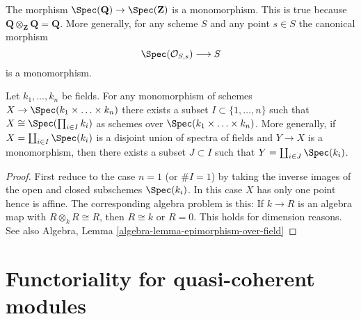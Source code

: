 \begin{example}
\label{example-Q-over-Z}
The morphism $\Spec(\mathbf{Q}) \to \Spec(\mathbf{Z})$
is a monomorphism. This is true because
$\mathbf{Q} \otimes_{\mathbf{Z}} \mathbf{Q} = \mathbf{Q}$.
More generally, for any scheme $S$ and any point $s \in S$ the
canonical morphism
$$
\Spec(\mathcal{O}_{S, s}) \longrightarrow S
$$
is a monomorphism.
\end{example}

\begin{lemma}
\label{lemma-mono-towards-spec-field}
Let $k_1, \ldots, k_n$ be fields.
For any monomorphism of schemes
$X \to \Spec(k_1 \times \ldots \times k_n)$
there exists a subset $I \subset \{1, \ldots, n\}$ such
that $X \cong \Spec(\prod_{i \in I} k_i)$ as
schemes over $\Spec(k_1 \times \ldots \times k_n)$.
More generally, if $X = \coprod_{i \in I} \Spec(k_i)$
is a disjoint union of spectra of fields and $Y \to X$ is a monomorphism,
then there exists a subset $J \subset I$ such that
$Y = \coprod_{i \in J} \Spec(k_i)$.
\end{lemma}

\begin{proof}
First reduce to the case $n = 1$ (or $\# I = 1$)
by taking the inverse images of the
open and closed subschemes $\Spec(k_i)$.
In this case $X$ has only one point hence is affine.
The corresponding algebra problem is this:
If $k \to R$ is an algebra map
with $R \otimes_k R \cong R$, then $R \cong k$ or $R = 0$.
This holds for dimension reasons.
See also
Algebra, Lemma \ref{algebra-lemma-epimorphism-over-field}
\end{proof}










\section{Functoriality for quasi-coherent modules}
\label{section-quasi-coherent}

